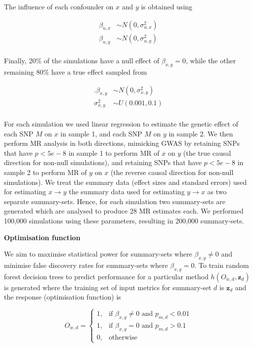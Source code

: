 \documentclass[]{article}
\begin{document}
The influence of each confounder on \(x\) and \(y\) is obtained using

\[
\begin{aligned}
\beta_{u,x} & \sim N(0, \sigma^{2}_{u,x}) \\
\beta_{u,y} & \sim N(0, \sigma^{2}_{u,y}) \\
\end{aligned}
\]

Finally, 20\% of the simulations have a null effect of
\(\beta_{x,y} = 0\), while the other remaining 80\% have a true effect
sampled from

\[
\begin{aligned}.
\beta_{x,y} & \sim N(0, \sigma^2_{x,y}) \\
\sigma^2_{x,y} & \sim U(0.001, 0.1) \\
\end{aligned}
\]

For each simulation we used linear regression to estimate the genetic
effect of each SNP \(M\) on \(x\) in sample 1, and each SNP \(M\) on
\(y\) in sample 2. We then perform MR analysis in both directions,
mimicking GWAS by retaining SNPs that have \(p < 5e-8\) in sample 1 to
perform MR of \(x\) on \(y\) (the true causal direction for non-null
simulations), and retaining SNPs that have \(p < 5e-8\) in sample 2 to
perform MR of \(y\) on \(x\) (the reverse causal direction for non-null
simulations). We treat the summary data (effect sizes and standard
errors) used for estimating \(x \rightarrow y\) the summary data used
for estimating \(y \rightarrow x\) as two separate summary-sets. Hence,
for each simulation two summary-sets are generated which are analysed to
produce 28 MR estimates each. We performed 100,000 simulations using
these parameters, resulting in 200,000 summary-sets.

\textbf{Optimisation function}

We aim to maximise statistical power for summary-sets where
\(\beta_{x,y} \neq 0\) and minimise false discovery rates for
summary-sets where \(\beta_{x,y} = 0\). To train random forest decision
trees to predict performance for a particular method
\(h(O_{w,d}, \textbf{z}_{d})\) is generated where the training set of
input metrics for summary-set \(d\) is \(\textbf{z}_{d}\) and the
response (optimisation function) is

\[
    O_{w,d} = 
\begin{cases}
    1,   & \text{if } \beta_{x,y} \neq 0 \text{ and } p_{m,d} < 0.01\\
    1,   & \text{if } \beta_{x,y} = 0 \text{ and } p_{m,d} > 0.1 \\
    0,   & \text{otherwise}
\end{cases}
\]
\end{document}
